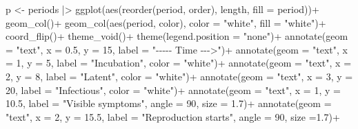 \documentclass[
  letterpaper,
  DIV=11,
  numbers=noendperiod]{scrreprt}
\newenvironment{Shaded}{\begin{snugshade}}{\end{snugshade}}
\newcommand{\AttributeTok}[1]{\textcolor[rgb]{0.40,0.45,0.13}{#1}}
\newcommand{\DecValTok}[1]{\textcolor[rgb]{0.68,0.00,0.00}{#1}}
\newcommand{\FloatTok}[1]{\textcolor[rgb]{0.68,0.00,0.00}{#1}}
\newcommand{\FunctionTok}[1]{\textcolor[rgb]{0.28,0.35,0.67}{#1}}
\newcommand{\NormalTok}[1]{\textcolor[rgb]{0.00,0.23,0.31}{#1}}
\newcommand{\OtherTok}[1]{\textcolor[rgb]{0.00,0.23,0.31}{#1}}
\newcommand{\SpecialCharTok}[1]{\textcolor[rgb]{0.37,0.37,0.37}{#1}}
\newcommand{\StringTok}[1]{\textcolor[rgb]{0.13,0.47,0.30}{#1}}
\begin{document}
\begin{Shaded}
\begin{Highlighting}[]
\NormalTok{p }\OtherTok{\textless{}{-}}\NormalTok{ periods }\SpecialCharTok{|\textgreater{}} 
  \FunctionTok{ggplot}\NormalTok{(}\FunctionTok{aes}\NormalTok{(}\FunctionTok{reorder}\NormalTok{(period, order), length, }\AttributeTok{fill =}\NormalTok{ period))}\SpecialCharTok{+}
  \FunctionTok{geom\_col}\NormalTok{()}\SpecialCharTok{+}
  \FunctionTok{geom\_col}\NormalTok{(}\FunctionTok{aes}\NormalTok{(period, color), }\AttributeTok{color =} \StringTok{"white"}\NormalTok{, }\AttributeTok{fill =} \StringTok{"white"}\NormalTok{)}\SpecialCharTok{+}
  \FunctionTok{coord\_flip}\NormalTok{()}\SpecialCharTok{+}
  \FunctionTok{theme\_void}\NormalTok{()}\SpecialCharTok{+}
  \FunctionTok{theme}\NormalTok{(}\AttributeTok{legend.position =} \StringTok{"none"}\NormalTok{)}\SpecialCharTok{+}
  \FunctionTok{annotate}\NormalTok{(}\AttributeTok{geom =} \StringTok{"text"}\NormalTok{, }\AttributeTok{x =} \FloatTok{0.5}\NormalTok{, }\AttributeTok{y =} \DecValTok{15}\NormalTok{, }\AttributeTok{label =} \StringTok{"{-}{-}{-}{-}{-} Time {-}{-}{-}\textgreater{}"}\NormalTok{)}\SpecialCharTok{+}
  \FunctionTok{annotate}\NormalTok{(}\AttributeTok{geom =} \StringTok{"text"}\NormalTok{, }\AttributeTok{x =} \DecValTok{1}\NormalTok{, }\AttributeTok{y =} \DecValTok{5}\NormalTok{, }\AttributeTok{label =} \StringTok{"Incubation"}\NormalTok{, }\AttributeTok{color =} \StringTok{"white"}\NormalTok{)}\SpecialCharTok{+}
  \FunctionTok{annotate}\NormalTok{(}\AttributeTok{geom =} \StringTok{"text"}\NormalTok{, }\AttributeTok{x =} \DecValTok{2}\NormalTok{, }\AttributeTok{y =} \DecValTok{8}\NormalTok{, }\AttributeTok{label =} \StringTok{"Latent"}\NormalTok{, }\AttributeTok{color =} \StringTok{"white"}\NormalTok{)}\SpecialCharTok{+}
  \FunctionTok{annotate}\NormalTok{(}\AttributeTok{geom =} \StringTok{"text"}\NormalTok{, }\AttributeTok{x =} \DecValTok{3}\NormalTok{, }\AttributeTok{y =} \DecValTok{20}\NormalTok{, }\AttributeTok{label =} \StringTok{"Infectious"}\NormalTok{, }\AttributeTok{color =} \StringTok{"white"}\NormalTok{)}\SpecialCharTok{+}
  \FunctionTok{annotate}\NormalTok{(}\AttributeTok{geom =} \StringTok{"text"}\NormalTok{, }\AttributeTok{x =} \DecValTok{1}\NormalTok{, }\AttributeTok{y =} \FloatTok{10.5}\NormalTok{, }\AttributeTok{label =} \StringTok{"Visible symptoms"}\NormalTok{, }\AttributeTok{angle =} \DecValTok{90}\NormalTok{, }\AttributeTok{size =} \FloatTok{1.7}\NormalTok{)}\SpecialCharTok{+}
  \FunctionTok{annotate}\NormalTok{(}\AttributeTok{geom =} \StringTok{"text"}\NormalTok{, }\AttributeTok{x =} \DecValTok{2}\NormalTok{, }\AttributeTok{y =} \FloatTok{15.5}\NormalTok{, }\AttributeTok{label =} \StringTok{"Reproduction starts"}\NormalTok{, }\AttributeTok{angle =} \DecValTok{90}\NormalTok{, }\AttributeTok{size =}\FloatTok{1.7}\NormalTok{)}\SpecialCharTok{+}

\end{Highlighting}
\end{Shaded}
\end{document}
